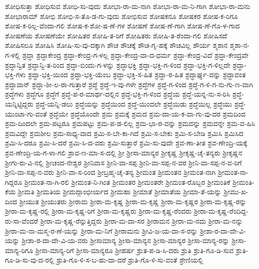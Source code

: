 {ಶೋಧಿಸುತ್ತಾ
ಶೋಧಿಸುವ
ಶೋಧಿ-ಸು-ವುದು
ಶೋಭಾ-ರಾ-ಮ-ನಾಗಿ
ಶೋಭಾ-ರಾ-ಮ-ನಿ-ಗಾಗಿ
ಶೋಭಾ-ರಾ-ಮನು
ಶೋಭಾರಾಮ್
ಶೋಭಿ
ಶೋಭಿ-ಸ-ತೊ-ಡ-ಗು-ವುದು
ಶೋಭಿಸುವ
ಶೋಷಕನೂ
ಶೋಷಕರ
ಶೋಷ-ಕ-ರಿಗೂ
ಶೋಷ-ಕ-ರಿಲ್ಲ-ವೆಂದಾ-ಗಲಿ
ಶೋಷ-ಕ-ಶೋ-ಷ-ಣೆ-ಗಳ
ಶೋಷಣೆ
ಶೋಷ-ಣೆ-ಗಾಗಿ
ಶೋಷ-ಣೆ-ಗೊ-ಳ-ಗಾದ
ಶೋಷಣೆಯ
ಶೋಷಣೆಯೇ
ಶೋಷಿತರ
ಶೋಷಿ-ತ-ರಿಗೆ
ಶೋಷಿತರು
ಶೋಷಿ-ತ-ರೆಂದಾ-ಗಲಿ
ಶೋಷಿಸದೆ
ಶೋಷಿಸಲೂ
ಶೋಷಿಸಿ
ಶೋಷಿ-ಸು-ವು-ದಕ್ಕಾಗಿ
ಶೌಚ
ಶೌಚಕ್ಕೆ
ಶೌಚ-ಗೃ-ಹಕ್ಕೆ
ಶೌಚವಿಲ್ಲ
ಶೌರ್ಯ
ಶ್ಮಶಾನ
ಶ್ಮಶಾ-ನ-ಗ-ಳಲ್ಲಿ
ಶ್ರದ್ಧಾ
ಶ್ರದ್ಧಾಕೇಂದ್ರ
ಶ್ರದ್ಧಾ-ಕೇಂದ್ರ-ಗ-ಳಲ್ಲ
ಶ್ರದ್ಧಾ-ಕೇಂದ್ರ-ವಾ-ದ-ಧರ್ಮ
ಶ್ರದ್ಧಾ-ಕೇಂದ್ರ-ವಿದೆ
ಶ್ರದ್ಧಾ-ಕೇಂದ್ರವೇ
ಶ್ರದ್ಧಾನ್ವಿತ
ಶ್ರದ್ಧಾನ್ವಿ-ತ-ರಿಂದ
ಶ್ರದ್ಧಾ-ಬಿಂದು-ಗ-ಳನ್ನು
ಶ್ರದ್ಧಾಭಕ್ತಿ
ಶ್ರದ್ಧಾ-ಭಕ್ತಿ-ಗ-ಳಿಂದ
ಶ್ರದ್ಧಾ-ಭಕ್ತಿ-ಗ-ಳಿಲ್ಲದೇ
ಶ್ರದ್ಧಾ-ಭಕ್ತಿ-ಗಳು
ಶ್ರದ್ಧಾ-ಭಕ್ತಿ-ಯಿಂದ
ಶ್ರದ್ಧಾ-ಭಕ್ತಿ-ಯೆಂಬ
ಶ್ರದ್ಧಾ-ಭಕ್ತಿ-ಸ-ಹಿತ
ಶ್ರದ್ಧಾ-ರ-ಹಿತ
ಶ್ರದ್ಧಾರ್ಘ್ಯ-ವನ್ನು
ಶ್ರದ್ಧಾವಂತ
ಶ್ರದ್ಧಾವಾನ್
ಶ್ರದ್ಧಾ-ಶೀ-ಲ-ರಾ-ಗುತ್ತಾರೆ
ಶ್ರದ್ಧೆ
ಶ್ರದ್ಧೆ-ಇ-ವು-ಗಳೇ
ಶ್ರದ್ಧೆಗಳ
ಶ್ರದ್ಧೆ-ಗ-ಳಿಂದ
ಶ್ರದ್ಧೆ-ಗ-ಳಿ-ಗ-ನು-ಗು-ಣ-ವಾಗಿ
ಶ್ರದ್ಧೆಗಳು
ಶ್ರದ್ಧೆಗೂ
ಶ್ರದ್ಧೆಗೆ
ಶ್ರದ್ಧೆ-ಪ-ರ-ಮಾರ್ಥ-ದಲ್ಲಿನ
ಶ್ರದ್ಧೆ-ಭಕ್ತಿ-ಗ-ಳಿಂದ
ಶ್ರದ್ಧೆಯ
ಶ್ರದ್ಧೆ-ಯನ್ನ-ನು-ಸ-ರಿಸಿ
ಶ್ರದ್ಧೆ-ಯನ್ನಿಟ್ಟಿದ್ದರು
ಶ್ರದ್ಧೆ-ಯನ್ನಿ-ಡಲು
ಶ್ರದ್ಧೆಯನ್ನು
ಶ್ರದ್ಧೆಯಿಂದ
ಶ್ರದ್ಧೆ-ಯಿಂದಲೇ
ಶ್ರದ್ಧೆಯಿಡು
ಶ್ರದ್ಧೆಯಿಲ್ಲ
ಶ್ರದ್ಧೆಯು
ಶ್ರದ್ಧೆ-ಯುಂಟಾ-ಗು-ವಂತೆ
ಶ್ರದ್ಧೆಯೇ
ಶ್ರದ್ಧೆಯೊಂದೇ
ಶ್ರಮ
ಶ್ರಮಕ್ಕೆ
ಶ್ರಮದ
ಶ್ರಮ-ದಾ-ಯ-ಕ-ವಾ-ಗು-ವು-ದರ
ಶ್ರಮದಿಂದ
ಶ್ರಮ-ದಿಂದಲೇ
ಶ್ರಮ-ಪಟ್ಟರೂ
ಶ್ರಮಪಟ್ಟು
ಶ್ರಮ-ಪ-ಡ-ಲಿಲ್ಲ
ಶ್ರಮ-ಭಾ-ರ-ವನ್ನು
ಶ್ರಮವನ್ನು
ಶ್ರಮವನ್ನೇ
ಶ್ರಮ-ವ-ಹಿಸಿ
ಶ್ರಮವಿದ್ದೇ
ಶ್ರಮಶೀಲ
ಶ್ರಮ-ಸಾಧ್ಯ-ವಾದ
ಶ್ರಮಿ-ಸ-ಬೇ-ಕಾ-ಗಿದೆ
ಶ್ರಮಿ-ಸ-ಬೇಕು
ಶ್ರಮಿ-ಸ-ಬೇಡಿ
ಶ್ರಮಿಸಿ
ಶ್ರಮಿಸಿದ
ಶ್ರಮಿ-ಸಿ-ದರೂ
ಶ್ರಮಿ-ಸಿ-ದರೆ
ಶ್ರಮಿ-ಸಿ-ದ-ವರು
ಶ್ರಮಿ-ಸುತ್ತಾರೆ
ಶ್ರಮಿ-ಸು-ವುದೇ
ಶ್ರವ-ಣಾ-ತೀತ
ಶ್ರವ-ಣೇಂದ್ರಿ-ಯಕ್ಕೆ
ಶ್ರವ-ಣೇಂದ್ರಿ-ಯ-ಗ-ಳಾ-ಗಲಿ
ಶ್ರಾವ-ಣ-ಮಾ-ಸ-ದಲ್ಲಿ
ಶ್ರೀ
ಶ್ರೀಸಾ-ಮಾನ್ಯರ
ಶ್ರೀಕೃಷ್ಣ
ಶ್ರೀಕೃಷ್ಣ-ಚೈ-ತನ್ಯರು
ಶ್ರೀಕೃಷ್ಣನ
ಶ್ರೀಗು-ರು-ವಿ-ನಲ್ಲಿ
ಶ್ರೀಚಂದ-ನೇಶ್ವರ
ಶ್ರೀನಿವಾಸ
ಶ್ರೀನಿ-ವಾ-ಸಪ್ಪ
ಶ್ರೀನಿ-ವಾ-ಸಪ್ಪ-ನ-ವರ
ಶ್ರೀನಿ-ವಾ-ಸಪ್ಪ-ನ-ವ-ರಿಗೆ
ಶ್ರೀನಿ-ವಾ-ಸಪ್ಪ-ನ-ವರು
ಶ್ರೀನಿ-ವಾ-ಸ-ರಿಂದ
ಶ್ರೀಬ್ರಹ್ಮ-ಚೈ-ತನ್ಯ
ಶ್ರೀಮಂತ
ಶ್ರೀಮಂತನ
ಶ್ರೀಮಂತ-ನಾಗಿ
ಶ್ರೀಮಂತ-ನಾ-ಗಿದ್ದರೂ
ಶ್ರೀಮಂತ-ನಾ-ಗಿ-ರಲಿ
ಶ್ರೀಮಂತ-ನಿ-ಗಿಂತ
ಶ್ರೀಮಂತರ
ಶ್ರೀಮಂತರೇ
ಶ್ರೀಮಂತ-ರೊಬ್ಬರ
ಶ್ರೀಮಂತಿಕೆ
ಶ್ರೀಮಂತಿ-ಕೆಯ
ಶ್ರೀಮತಿ
ಶ್ರೀಮತಿಯ
ಶ್ರೀಮದ್ಗಾಂಭೀರ್ಯದ
ಶ್ರೀಮಹಾ
ಶ್ರೀಮಾತೆ
ಶ್ರೀಮಾತೆಯ
ಶ್ರೀಮಾ-ತೆ-ಯನ್ನು
ಶ್ರೀಮು-ಖ-ದಿಂದ
ಶ್ರೀಯುತ
ಶ್ರೀಯುತರು
ಶ್ರೀರಾಮ
ಶ್ರೀರಾ-ಮ-ಕೃಷ್ಣ
ಶ್ರೀರಾ-ಮ-ಕೃಷ್ಣ
ಶ್ರೀರಾ-ಮ-ಕೃಷ್ಣರ
ಶ್ರೀರಾ-ಮ-ಕೃಷ್ಣ-ರನ್ನು
ಶ್ರೀರಾ-ಮ-ಕೃಷ್ಣ-ರಲ್ಲಿ
ಶ್ರೀರಾ-ಮ-ಕೃಷ್ಣ-ರಿಗೆ
ಶ್ರೀರಾ-ಮ-ಕೃಷ್ಣರು
ಶ್ರೀರಾ-ಮ-ಕೃಷ್ಣ-ರೆಂದರು
ಶ್ರೀರಾ-ಮ-ಕೃಷ್ಣ-ರೆಂದಿದ್ದ-ರು-ಸಾ-ವೆಂದರೆ
ಶ್ರೀರಾ-ಮ-ಕೃಷ್ಣ-ರೆನ್ನುತ್ತಿದ್ದರು
ಶ್ರೀರಾ-ಮ-ದಾ-ಸರ
ಶ್ರೀರಾಮನ
ಶ್ರೀರಾ-ಮ-ನದು
ಶ್ರೀರಾ-ಮ-ನನ್ನು
ಶ್ರೀರಾ-ಮ-ನಾ-ಮಸ್ಮ-ರ-ಣೆ-ಯನ್ನು
ಶ್ರೀರಾ-ಮ-ನಿಗೆ
ಶ್ರೀರಾಮನು
ಶ್ರೀವಿ-ಜ-ಯ-ದಾ-ಸ-ರನ್ನು
ಶ್ರೀಶಾ-ರ-ದಾ-ದೇ-ವಿ-ಯನ್ನು
ಶ್ರೀಶಾ-ರ-ದಾ-ದೇ-ವಿ-ಯ-ವರು
ಶ್ರೀಸಾಮಾನ್ಯ
ಶ್ರೀಸಾ-ಮಾನ್ಯನ
ಶ್ರೀಸಾ-ಮಾನ್ಯರ
ಶ್ರೀಸಾ-ಮಾನ್ಯ-ರನ್ನು
ಶ್ರೀಸಾ-ಮಾನ್ಯ-ರಿಗೂ
ಶ್ರೀಸಾ-ಮಾನ್ಯ-ರಿಗೆ
ಶ್ರೀಸಾ-ಮಾನ್ಯರೂ
ಶ್ರೀಹರ್ಷ
ಶ್ರುತ-ಪ-ಡಿ-ಸಿ-ದರು
ಶ್ರುತಿ
ಶ್ರುತಿ-ಗೂ-ಡಿ-ಸುವ
ಶ್ರುತಿ-ಗೂ-ಡಿ-ಸು-ವು-ದ-ರಲ್ಲಿ
ಶ್ರುತಿ-ಗೊ-ಳಿ-ಸ-ಬ-ಹು-ದಾ-ದರೆ
ಶ್ರುತಿ-ಗೊ-ಳಿ-ಸು-ವಂತೆ
ಶ್ರೇಣಿಯಲ್ಲಿ
}
